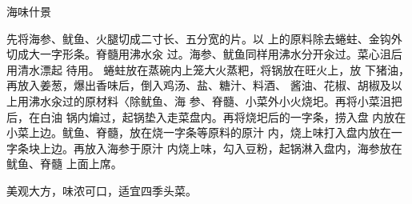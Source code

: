 \begin{recipe}{海味什景}

\ingredients


\cooking

\step 先将海参、鱿鱼、火腿切成二寸长、五分宽的片。以 上的原料除去蜷蛀、金钩外切成大一字形条。脊髓用沸水汆 过。海参、鱿鱼同样用沸水分开汆过。菜心沮后用清水漂起 待用。
\step 蜷蛀放在蒸碗内上笼大火蒸粑，将锅放在旺火上，放 下猪油，再放入姜葱，爆出香味后，倒入鸡汤、盐、糖汁、料酒、 酱油、花椒、胡椒及以上用沸水汆过的原材料〈除鱿鱼、海 参、脊髓、小菜外小火烧圯。再将小菜沮把后，在白油 锅内煸过，起锅垫入走菜盘内。再将烧圯后的一字条，捞入盘 内放在小菜上边。鱿鱼、脊髓，放在烧一字条等原料的原汁
内，烧上味打入盘内放在一字条块上边。再放入海参于原汁 内烧上味，勾入豆粉，起锅淋入盘内，海参放在鱿鱼、脊髓 上面上席。

\notes

美观大方，味浓可口，适宜四季头菜。

\end{recipe}

